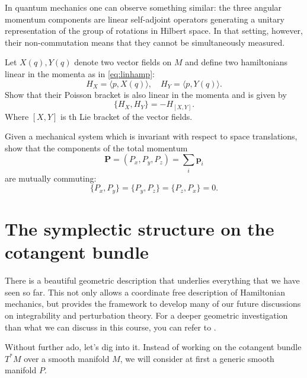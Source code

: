 \documentclass[english,fontsize=11pt,paper=a5,oneside]{scrbook}
\newcommand{\bp}{\bm{p}}
\theoremstyle{definition}
\newenvironment{example}
  {\pushQED{\qed}\renewcommand{\qedsymbol}{$\lozenge$}\examplex}
  {\popQED\endexamplex}
\newenvironment{exercise}
  {\pushQED{\qed}\renewcommand{\qedsymbol}{$\maltese$}\exercisex}
  {\popQED\endexercisex}
\begin{document}
\begin{example}
  In quantum mechanics one can observe something similar: the three angular momentum components are linear self-adjoint operators generating a unitary representation of the group of rotations in Hilbert space.
  In that setting, however, their non-commutation means that they cannot be simultaneously measured.
\end{example}

\begin{exercise}
  Let $X(q), Y(q)$ denote two vector fields on $M$ and define two hamiltonians linear in the momenta as in \eqref{eq:linhamp}:
  \begin{equation}
    H_X = \langle p, X(q)\rangle,\quad H_Y = \langle p, Y(q) \rangle.
  \end{equation}
  Show that their Poisson bracket is also linear in the momenta and is given by
  \begin{equation}
    \big\{H_X, H_Y\big\} = - H_{[X,Y]}.
  \end{equation}
  Where $[X,Y]$ is th Lie bracket of the vector fields.
\end{exercise}

\begin{exercise}
  Given a mechanical system which is invariant with respect to space translations, show that the components of the total momentum
  \begin{equation}
    \bm P = (P_x, P_y, P_z) = \sum_i \bp_i
  \end{equation}
  are mutually commuting:
  \begin{equation}
    \big\{P_x, P_y\big\}
    =\big\{P_y, P_z\big\}
    =\big\{P_z, P_x\big\}
    =0.
  \end{equation}
\end{exercise}

\section{The symplectic structure on the cotangent bundle}

There is a beautiful geometric description that underlies everything that we have seen so far.
This not only allows a coordinate free description of Hamiltonian mechanics, but provides the framework to develop many of our future discussions on integrability and perturbation theory.
For a deeper geometric investigation than what we can discuss in this course, you can refer to \cite{book:dasilva}.

Without further ado, let's dig into it. Instead of working on the cotangent bundle $T^*M$ over a smooth manifold $M$, we will consider at first a generic smooth manifold $P$.
\end{document}
